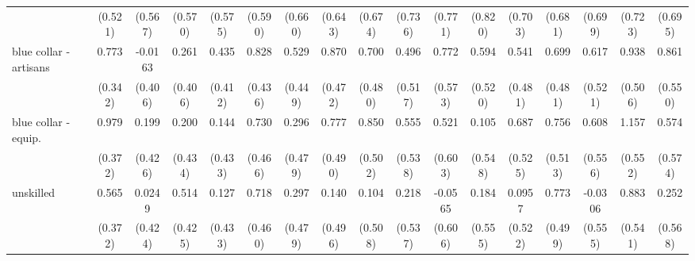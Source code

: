 {\begin{tabular}{l*{16}{c}}
                    &     (0.521)         &     (0.567)         &     (0.570)         &     (0.575)         &     (0.590)         &     (0.660)         &     (0.643)         &     (0.674)         &     (0.736)         &     (0.771)         &     (0.820)         &     (0.703)         &     (0.681)         &     (0.699)         &     (0.723)         &     (0.695)         \\
[1em]
blue collar - artisans&       0.773\sym{*}  &     -0.0163         &       0.261         &       0.435         &       0.828         &       0.529         &       0.870         &       0.700         &       0.496         &       0.772         &       0.594         &       0.541         &       0.699         &       0.617         &       0.938         &       0.861         \\
                    &     (0.342)         &     (0.406)         &     (0.406)         &     (0.412)         &     (0.436)         &     (0.449)         &     (0.472)         &     (0.480)         &     (0.517)         &     (0.573)         &     (0.520)         &     (0.481)         &     (0.481)         &     (0.521)         &     (0.506)         &     (0.550)         \\
[1em]
blue collar - equip.&       0.979\sym{**} &       0.199         &       0.200         &       0.144         &       0.730         &       0.296         &       0.777         &       0.850         &       0.555         &       0.521         &       0.105         &       0.687         &       0.756         &       0.608         &       1.157\sym{*}  &       0.574         \\
                    &     (0.372)         &     (0.426)         &     (0.434)         &     (0.433)         &     (0.466)         &     (0.479)         &     (0.490)         &     (0.502)         &     (0.538)         &     (0.603)         &     (0.548)         &     (0.525)         &     (0.513)         &     (0.556)         &     (0.552)         &     (0.574)         \\
[1em]
unskilled           &       0.565         &      0.0249         &       0.514         &       0.127         &       0.718         &       0.297         &       0.140         &       0.104         &       0.218         &     -0.0565         &       0.184         &      0.0957         &       0.773         &     -0.0306         &       0.883         &       0.252         \\
                    &     (0.372)         &     (0.424)         &     (0.425)         &     (0.433)         &     (0.460)         &     (0.479)         &     (0.496)         &     (0.508)         &     (0.537)         &     (0.606)         &     (0.555)         &     (0.522)         &     (0.499)         &     (0.555)         &     (0.541)         &     (0.568)         \\

\end{tabular}}
